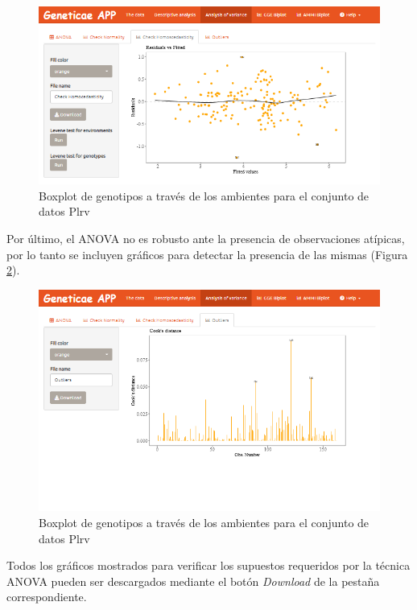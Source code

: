 \begin{figure}[H]
	\begin{center}
		\includegraphics[width=16cm]{./Graficos/Homocedasticidad.png}
	\end{center}
	\caption{Boxplot de genotipos a través de los ambientes para el conjunto de datos Plrv}
	\label{fig:fig4310}
\end{figure}

Por último, el ANOVA no es robusto ante la presencia de observaciones atípicas, por lo tanto se incluyen gráficos para detectar la presencia de las mismas (Figura \ref{fig:fig4311}).

\begin{figure}[H]
	\begin{center}
		\includegraphics[width=16cm]{./Graficos/Outliers.png}
	\end{center}
	\caption{Boxplot de genotipos a través de los ambientes para el conjunto de datos Plrv}
	\label{fig:fig4311}
\end{figure}

Todos los gráficos mostrados para verificar los supuestos requeridos por la técnica ANOVA pueden ser descargados mediante el botón \emph{Download} de la pestaña correspondiente.

